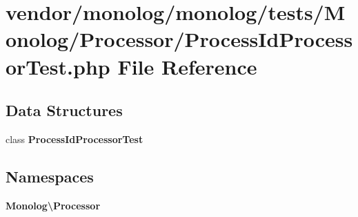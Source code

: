 \section{vendor/monolog/monolog/tests/\+Monolog/\+Processor/\+Process\+Id\+Processor\+Test.php File Reference}
\label{_process_id_processor_test_8php}
\subsection*{Data Structures}
\begin{DoxyCompactItemize}
\item 
class {\bf Process\+Id\+Processor\+Test}
\end{DoxyCompactItemize}
\subsection*{Namespaces}
\begin{DoxyCompactItemize}
\item 
 {\bf Monolog\textbackslash{}\+Processor}
\end{DoxyCompactItemize}
